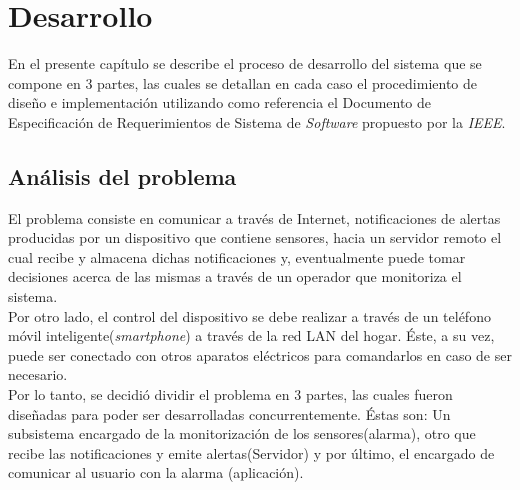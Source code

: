 
\chapter{Desarrollo} %

En el presente capítulo se describe el proceso de desarrollo del sistema que se compone en 3 partes, las cuales se detallan en cada caso el procedimiento de diseño e implementación utilizando como referencia el Documento de Especificación de Requerimientos de Sistema de \textit{Software} propuesto por la \textit{IEEE}.\\

\label{Chapter3} %


\section{Análisis del problema}
El problema consiste en comunicar a través de Internet, notificaciones de alertas producidas por un dispositivo que contiene sensores, hacia un servidor remoto el cual recibe y almacena dichas notificaciones y, eventualmente puede tomar decisiones acerca de las mismas a través de un operador que monitoriza el sistema. \\
Por otro lado, el control del dispositivo se debe realizar a través de un teléfono móvil inteligente(\textit{smartphone}) a través de la red LAN del hogar. Éste, a su vez, puede ser conectado con otros aparatos eléctricos para comandarlos en caso de ser necesario.\\
Por lo tanto, se decidió dividir el problema en 3 partes, las cuales fueron diseñadas para poder ser desarrolladas concurrentemente. Éstas son: Un subsistema encargado de la monitorización de los sensores(alarma), otro que recibe las notificaciones y emite alertas(Servidor) y por último, el encargado de comunicar al usuario con la alarma (aplicación).
\newpage
